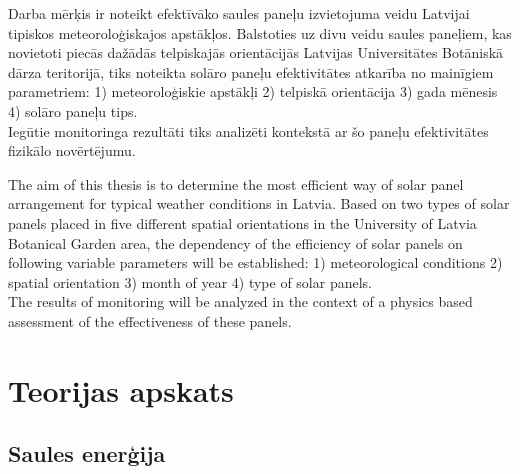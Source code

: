 \documentclass[singlespacing, latexmargins]{ludis}
\begin{document}
\maketitle

\begin{abstract-lv}
Darba mērķis ir noteikt efektīvāko saules paneļu izvietojuma veidu Latvijai tipiskos meteoroloģiskajos apstākļos. 
Balstoties uz divu veidu saules paneļiem, kas novietoti piecās dažādās telpiskajās orientācijās Latvijas Universitātes Botāniskā dārza teritorijā, tiks noteikta solāro paneļu efektivitātes atkarība no mainīgiem parametriem:
1) meteoroloģiskie apstākļi
2) telpiskā orientācija
3) gada mēnesis
4) solāro paneļu tips. \\
Iegūtie monitoringa rezultāti tiks analizēti kontekstā ar šo paneļu efektivitātes fizikālo novērtējumu.\\

\end{abstract-lv}

\begin{abstract-en}
The aim of this thesis is to determine the most efficient way of solar panel arrangement for typical weather conditions in Latvia.
Based on two types of solar panels placed in five different spatial orientations in the University of Latvia Botanical Garden area, the dependency of the efficiency of solar panels on following variable parameters will be established:
1) meteorological conditions
2) spatial orientation
3) month of year
4) type of solar panels.\\
The results of monitoring will be analyzed in the context of a physics based assessment of the effectiveness of these panels.\\

\end{abstract-en}

\tableofcontents





\chapter{Teorijas apskats}


\section{Saules enerģija}

\end{document}
